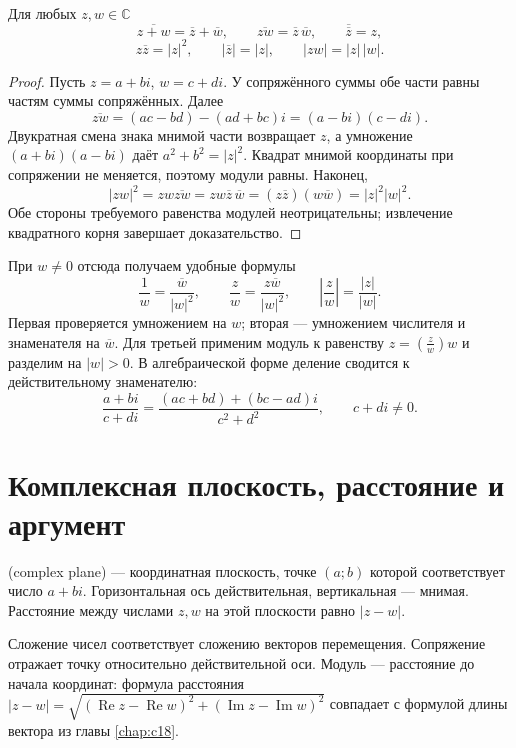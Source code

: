 \begin{theorem}\label{thm:legacy-c23-3}
Для любых \(z,w\in\mathbb C\)
\[
\overline{z+w}=\overline z+\overline w,\qquad
\overline{zw}=\overline z\,\overline w,\qquad
\overline{\overline z}=z,
\]
\[
z\overline z=|z|^2,\qquad
|\overline z|=|z|,\qquad |zw|=|z|\,|w|.
\]
\end{theorem}
\begin{proof}
Пусть \(z=a+bi\), \(w=c+di\). У сопряжённого суммы обе части равны частям суммы сопряжённых. Далее
\[
\overline{zw}=(ac-bd)-(ad+bc)i=(a-bi)(c-di).
\]
Двукратная смена знака мнимой части возвращает \(z\), а умножение \((a+bi)(a-bi)\) даёт \(a^2+b^2=|z|^2\). Квадрат мнимой координаты при сопряжении не меняется, поэтому модули равны. Наконец,
\[
|zw|^2=zw\overline{zw}
=zw\overline z\,\overline w
=(z\overline z)(w\overline w)=|z|^2|w|^2.
\]
Обе стороны требуемого равенства модулей неотрицательны; извлечение квадратного корня завершает доказательство.
\end{proof}
При \(w\ne0\) отсюда получаем удобные формулы
\[
\frac1w=\frac{\overline w}{|w|^2},\qquad
\frac zw=\frac{z\overline w}{|w|^2},\qquad
\left|\frac zw\right|=\frac{|z|}{|w|}.
\]
Первая проверяется умножением на \(w\); вторая — умножением числителя и знаменателя на \(\overline w\). Для третьей применим модуль к равенству \(z=(\frac zw)w\) и разделим на \(|w|>0\). В алгебраической форме деление сводится к действительному знаменателю:
\[
\frac{a+bi}{c+di}=\frac{(ac+bd)+(bc-ad)i}{c^2+d^2},\qquad c+di\ne0.
\]

\section{Комплексная плоскость, расстояние и аргумент}
\begin{definition}
 (complex plane) — координатная плоскость, точке \((a;b)\) которой соответствует число \(a+bi\). Горизонтальная ось действительная, вертикальная — мнимая. Расстояние между числами \(z,w\) на этой плоскости равно \(|z-w|\).
\end{definition}
Сложение чисел соответствует сложению векторов перемещения. Сопряжение отражает точку относительно действительной оси. Модуль — расстояние до начала координат: формула расстояния \(|z-w|=\sqrt{(\operatorname{Re}z-\operatorname{Re}w)^2+(\operatorname{Im}z-\operatorname{Im}w)^2}\) совпадает с формулой длины вектора из главы \ref{chap:c18}.

